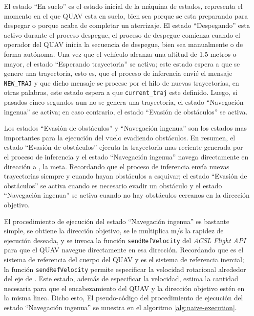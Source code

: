 El estado ``En suelo'' es el estado inicial de la máquina de estados, representa el momento en el que QUAV esta en suelo, bien sea porque se esta preparando para despegar o porque acaba de completar un aterrizaje. El estado ``Despegando'' esta activo durante el proceso despegue, el proceso de despegue comienza cuando el operador del QUAV inicia la secuencia de despegue, bien sea manualmente o de forma autónoma. Una vez que el vehículo alcanza una altitud de 1.5 metros o mayor, el estado ``Esperando trayectoria'' se activa; este estado espera a que se genere una trayectoria, esto es, que el proceso de inferencia envié el mensaje \texttt{NEW\_TRAJ} y que dicho mensaje se procese por el hilo de nuevas trayectorias, en otras palabras, este estado espera a que \texttt{current\_traj} este definido. Luego, si pasados cinco segundos aun no se genera una trayectoria, el estado ``Navegación ingenua'' se activa; en caso contrario, el estado ``Evasión de obstáculos'' se activa.

Los estados ``Evasión de obstáculos'' y ``Navegación ingenua'' son los estados mas importantes para la ejecución del vuelo evadiendo obstáculos. En resumen, el estado ``Evasión de obstáculos'' ejecuta la trayectoria mas reciente generada por el proceso de inferencia y el estado ``Navegación ingenua'' navega directamente en dirección a , la meta. Recordando que el proceso de inferencia envía nuevas trayectorias siempre y cuando hayan obstáculos a esquivar; el estado ``Evasión de obstáculos'' se activa cuando es necesario evadir un obstáculo y el estado ``Navegación ingenua'' se activa cuando no hay obstáculos cercanos en la dirección objetivo. 

El procedimiento de ejecución del estado ``Navegación ingenua'' es bastante simple, se obtiene la dirección objetivo, se le multiplica  m/s la rapidez de ejecución deseada, y se invoca la función \texttt{sendRefVelocity} del \textit{ACSL Flight API} para que el QUAV navegue directamente en esa dirección. Recordando que  es el sistema de referencia del cuerpo del QUAV y  es el sistema de referencia inercial; la función \texttt{sendRefVelocity} permite especificar  la velocidad rotacional alrededor del eje  de . Este estado, además de especificar la velocidad, estima la cantidad  necesaria para que el encabezamiento del QUAV y la dirección objetivo estén en la misma linea. Dicho esto, El pseudo-código del procedimiento de ejecución del estado ``Navegación ingenua'' se muestra en el algoritmo \ref{alg:naive-execution}.

